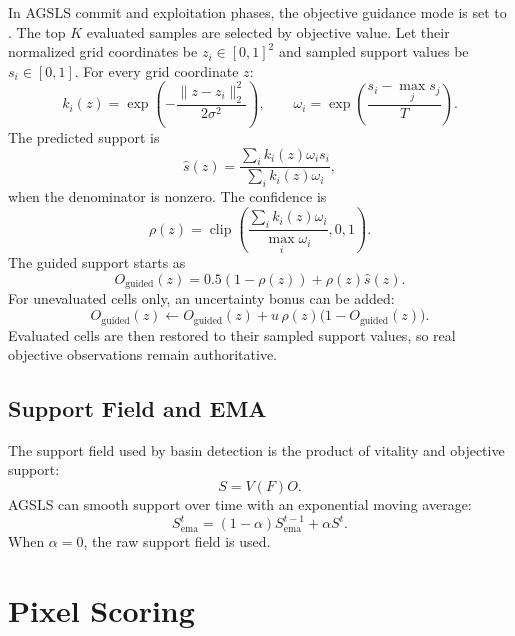 \documentclass[11pt]{article}
\newcommand{\code}[1]{\texttt{\detokenize{#1}}}
\newcommand{\clip}{\operatorname{clip}}
\begin{document}
In AGSLS commit and exploitation phases, the objective guidance mode is set
to \code{rbf}. The top $K$ evaluated samples are selected by objective value.
Let their normalized grid coordinates be $z_i\in[0,1]^2$ and sampled support
values be $s_i\in[0,1]$. For every grid coordinate $z$:
\begin{equation}
k_i(z)=\exp\left(-\frac{\|z-z_i\|_2^2}{2\sigma^2}\right),
\qquad
\omega_i=\exp\left(\frac{s_i-\max_j s_j}{T}\right).
\label{eq:rbf-weights}
\end{equation}
The predicted support is
\begin{equation}
\hat s(z)
= \frac{\sum_i k_i(z)\omega_i s_i}
{\sum_i k_i(z)\omega_i},
\label{eq:rbf-prediction}
\end{equation}
when the denominator is nonzero. The confidence is
\begin{equation}
\rho(z)=\clip\left(\frac{\sum_i k_i(z)\omega_i}{\max_i \omega_i},0,1\right).
\label{eq:rbf-confidence}
\end{equation}
The guided support starts as
\begin{equation}
O_{\mathrm{guided}}(z)
= 0.5(1-\rho(z))+\rho(z)\hat s(z).
\label{eq:guided-support}
\end{equation}
For unevaluated cells only, an uncertainty bonus can be added:
\begin{equation}
O_{\mathrm{guided}}(z)
\leftarrow
O_{\mathrm{guided}}(z)
+ u\,\rho(z)\bigl(1-O_{\mathrm{guided}}(z)\bigr).
\label{eq:uncertainty-bonus}
\end{equation}
Evaluated cells are then restored to their sampled support values, so real
objective observations remain authoritative.

\subsection{Support Field and EMA}

The support field used by basin detection is the product of vitality and
objective support:
\begin{equation}
S = V(F)O.
\label{eq:support-field}
\end{equation}
AGSLS can smooth support over time with an exponential moving average:
\begin{equation}
S_{\mathrm{ema}}^t
= (1-\alpha)S_{\mathrm{ema}}^{t-1}+\alpha S^t.
\label{eq:support-ema}
\end{equation}
When $\alpha=0$, the raw support field is used.

\section{Pixel Scoring}
\end{document}
